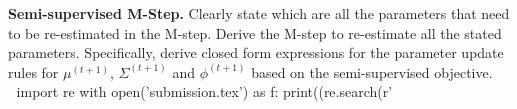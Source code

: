 \item{} \textbf{Semi-supervised M-Step.}
Clearly state which are all the parameters that need to be re-estimated in the M-step. Derive the M-step to re-estimate all the stated parameters.  Specifically,
derive closed form expressions for the parameter update rules for $\mu^{(t+1)}$, $\Sigma^{(t+1)}$ and $\phi^{(t+1)}$ based on the semi-supervised objective.\\

🐍
import re
with open('submission.tex') as f: print((re.search(r'%
🐍
